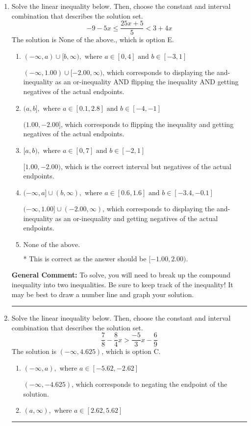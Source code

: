 \documentclass{extbook}[14pt]
\newcommand{\litem}[1]{\item #1

\rule{\textwidth}{0.4pt}}
\begin{document}
\begin{enumerate}\litem{
Solve the linear inequality below. Then, choose the constant and interval combination that describes the solution set.
\[ -9 - 5 x \leq \frac{25 x + 5}{5} < 3 + 4 x \]The solution is \( \text{None of the above.} \), which is option E.\begin{enumerate}[label=\Alph*.]
\item \( (-\infty, a) \cup [b, \infty), \text{ where } a \in [0, 4] \text{ and } b \in [-3, 1] \)

$(-\infty, 1.00) \cup [-2.00, \infty)$, which corresponds to displaying the and-inequality as an or-inequality AND flipping the inequality AND getting negatives of the actual endpoints.
\item \( (a, b], \text{ where } a \in [0.1, 2.8] \text{ and } b \in [-4, -1] \)

$(1.00, -2.00]$, which corresponds to flipping the inequality and getting negatives of the actual endpoints.
\item \( [a, b), \text{ where } a \in [0, 7] \text{ and } b \in [-2, 1] \)

$[1.00, -2.00)$, which is the correct interval but negatives of the actual endpoints.
\item \( (-\infty, a] \cup (b, \infty), \text{ where } a \in [0.6, 1.6] \text{ and } b \in [-3.4, -0.1] \)

$(-\infty, 1.00] \cup (-2.00, \infty)$, which corresponds to displaying the and-inequality as an or-inequality and getting negatives of the actual endpoints.
\item \( \text{None of the above.} \)

* This is correct as the answer should be $[-1.00, 2.00)$.
\end{enumerate}

\textbf{General Comment:} To solve, you will need to break up the compound inequality into two inequalities. Be sure to keep track of the inequality! It may be best to draw a number line and graph your solution.
}
\litem{
Solve the linear inequality below. Then, choose the constant and interval combination that describes the solution set.
\[ \frac{7}{8} - \frac{8}{4} x > \frac{-5}{3} x - \frac{6}{9} \]The solution is \( (-\infty, 4.625) \), which is option C.\begin{enumerate}[label=\Alph*.]
\item \( (-\infty, a), \text{ where } a \in [-5.62, -2.62] \)

 $(-\infty, -4.625)$, which corresponds to negating the endpoint of the solution.
\item \( (a, \infty), \text{ where } a \in [2.62, 5.62] \)


\end{enumerate}}
\end{enumerate}
\end{document}
